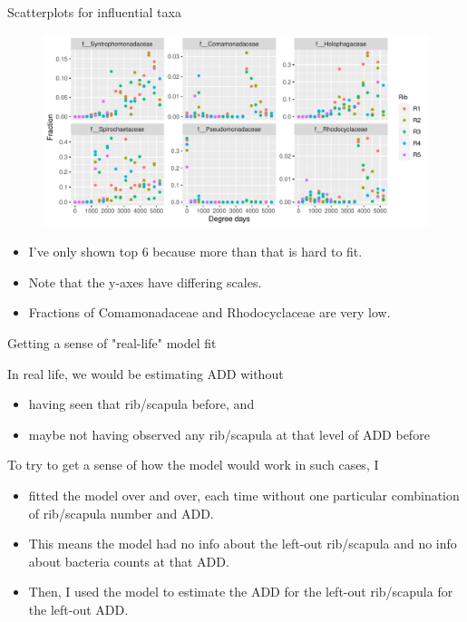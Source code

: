 \documentclass{beamer}
\begin{document}
\begin{frame}{Scatterplots for influential taxa}

  \begin{center}
    \begin{figure}
      \includegraphics[width=4.75in]{use_families/w_ribs/infl_rib_family_scatter}
    \end{figure}
  \end{center}
  \vspace{-0.25in}
  {\scriptsize
  \begin{itemize}
  \item I've only shown top 6 because more than that is hard to fit.
  \item Note that the y-axes have differing scales.
  \item Fractions of Comamonadaceae and Rhodocyclaceae are very low.
  \end{itemize}
  }

\end{frame}


\begin{frame}{Getting a sense of "real-life" model fit}

  \noindent In real life, we would be estimating ADD without
  \begin{itemize}
    \item having seen that rib/scapula before, and
    \item maybe not having observed any rib/scapula at that level of ADD before
  \end{itemize} 

  \vspace{0.1in}

  \noindent To try to get a sense of how the model would work in such cases, I
  \begin{itemize}
    \item fitted the model over and over, each time without one particular
    combination of rib/scapula number and ADD.
    \item This means the model had no info about the left-out rib/scapula and no
    info about bacteria counts at that ADD.
    \item Then, I used the model to estimate the ADD for the left-out
    rib/scapula for the left-out ADD.
  \end{itemize}
  
\end{frame}
\end{document}
